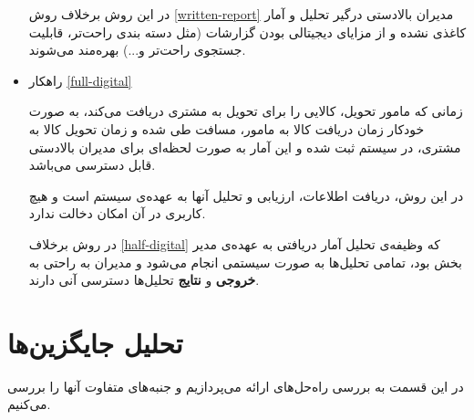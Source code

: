 \documentclass[12pt]{article}
\begin{document}
\begin{itemize}
    در این روش برخلاف روش \ref{written-report} مدیران بالادستی درگیر تحلیل و آمار کاغذی نشده و از مزایای دیجیتالی بودن گزارشات (مثل دسته بندی راحت‌تر، قابلیت جستجو‌ی راحت‌تر و...) بهره‌مند می‌شوند.
    \item راهکار \ref{full-digital}
    
    زمانی که مامور تحویل، کالایی را برای تحویل به مشتری دریافت می‌کند، به صورت خودکار زمان دریافت کالا به مامور، مسافت طی شده و زمان تحویل کالا به مشتری، در سیستم ثبت شده و این آمار به صورت لحظه‌‌ای برای مدیران بالادستی قابل دسترسی می‌باشد.
    
    در این روش، دریافت اطلاعات، ارزیابی و تحلیل آنها به عهده‌ی سیستم است و هیچ کاربری در آن امکان دخالت ندارد. 
    
    در روش برخلاف \ref{half-digital} که وظیفه‌ی تحلیل آمار دریافتی به عهده‌ی مدیر بخش بود، تمامی تحلیل‌ها به صورت سیستمی انجام می‌شود و مدیران به راحتی به \textbf{خروجی} و \textbf{نتایج} تحلیل‌ها دسترسی آنی دارند.
    
\end{itemize}

\section{تحلیل جایگزین‌ها}
در این قسمت به بررسی راه‌حل‌های ارائه می‌پردازیم و جنبه‌های متفاوت‌ آنها را بررسی می‌کنیم.
\end{document}
